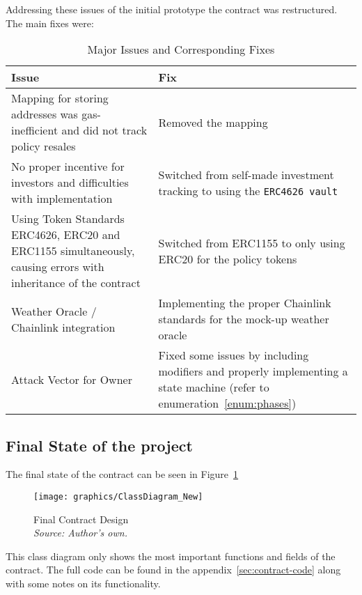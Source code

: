 \documentclass[11pt,a4paper]{article}
\begin{document}
		Addressing these issues of the initial prototype the contract was restructured.
		The main fixes were:

		\begin{table}[h]
			\centering
			\caption{Major Issues and Corresponding Fixes}
			\label{tab:issues-fixes}
			\begin{tabular}{|p{0.42\textwidth}|p{}|}
				\hline
				\textbf{Issue} & \textbf{Fix} \\
				\hline
				Mapping for storing addresses was gas-inefficient and did not track policy resales & Removed the mapping \\
				\hline
				No proper incentive for investors and difficulties with implementation & Switched from self-made investment tracking to using the \texttt{ERC4626 vault} \\
				\hline
				Using Token Standards ERC4626, ERC20 and ERC1155 simultaneously, causing errors with inheritance of the contract & Switched from ERC1155 to only using ERC20 for the policy tokens \\
				\hline
				Weather Oracle / Chainlink integration & Implementing the proper Chainlink standards for the mock-up weather oracle~\parencite{AggregatorV3Interface} \\
				\hline
				Attack Vector for Owner & Fixed some issues by including modifiers and properly implementing a state machine (refer to enumeration~\ref{enum:phases}) \\
				\hline
			\end{tabular}
		\end{table}

        \pagebreak

		\subsection{Final State of the project}\label{subsec:final-state}

		The final state of the contract can be seen in Figure~\ref{fig:final-contract-design}
		\begin{figure}[h]
			\centering
			\texttt{[image: graphics/ClassDiagram\_New]}
			\caption{Final Contract Design \\ \textit{Source: Author's own.}}
			\label{fig:final-contract-design}
		\end{figure}

		This class diagram only shows the most important functions and fields of the contract.
		The full code can be found in the appendix~\ref{sec:contract-code} along with some notes on its functionality.
\end{document}
